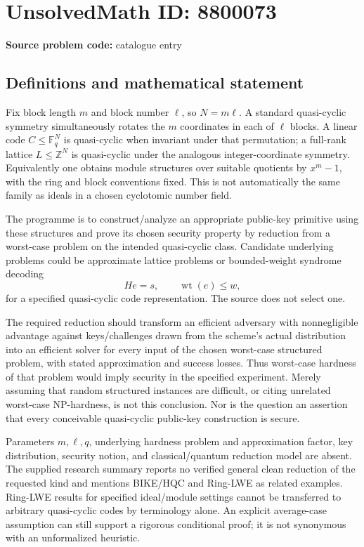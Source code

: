 \documentclass[11pt]{article}
\newcommand{\Z}{\mathbb{Z}}
\newcommand{\F}{\mathbb{F}}
\begin{document}
\section*{UnsolvedMath ID: 8800073}
\textbf{Source problem code:} catalogue entry
\subsection{Definitions and mathematical statement}
Fix block length \(m\) and block number \(\ell\), so \(N=m\ell\). A standard quasi-cyclic symmetry simultaneously rotates the \(m\) coordinates in each of \(\ell\) blocks. A linear code \(C\le\F_q^N\) is quasi-cyclic when invariant under that permutation; a full-rank lattice \(L\le\Z^N\) is quasi-cyclic under the analogous integer-coordinate symmetry. Equivalently one obtains module structures over suitable quotients by \(x^m-1\), with the ring and block conventions fixed. This is not automatically the same family as ideals in a chosen cyclotomic number field.

The programme is to construct/analyze an appropriate public-key primitive using these structures and prove its chosen security property by reduction from a worst-case problem on the intended quasi-cyclic class. Candidate underlying problems could be approximate lattice problems or bounded-weight syndrome decoding
\[
He=s,\qquad\operatorname{wt}(e)\le w,
\]
for a specified quasi-cyclic code representation. The source does not select one.

The required reduction should transform an efficient adversary with nonnegligible advantage against keys/challenges drawn from the scheme's actual distribution into an efficient solver for every input of the chosen worst-case structured problem, with stated approximation and success losses. Thus worst-case hardness of that problem would imply security in the specified experiment. Merely assuming that random structured instances are difficult, or citing unrelated worst-case NP-hardness, is not this conclusion. Nor is the question an assertion that every conceivable quasi-cyclic public-key construction is secure.

Parameters \(m,\ell,q\), underlying hardness problem and approximation factor, key distribution, security notion, and classical/quantum reduction model are absent. The supplied research summary reports no verified general clean reduction of the requested kind and mentions BIKE/HQC and Ring-LWE as related examples. Ring-LWE results for specified ideal/module settings cannot be transferred to arbitrary quasi-cyclic codes by terminology alone. An explicit average-case assumption can still support a rigorous conditional proof; it is not synonymous with an unformalized heuristic.
\end{document}
